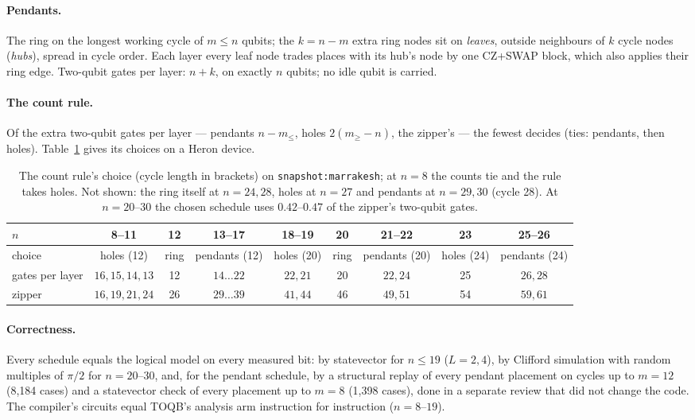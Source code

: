 \documentclass[11pt]{article}
\begin{document}
\paragraph{Pendants.} The ring on the longest working cycle of $m \le n$ qubits; the $k = n-m$ extra ring nodes sit on
\emph{leaves}, outside neighbours of $k$ cycle nodes (\emph{hubs}), spread in cycle order. Each layer every leaf node
trades places with its hub's node by one CZ+SWAP block, which also applies their ring edge. Two-qubit gates per layer:
$n + k$, on exactly $n$ qubits; no idle qubit is carried.

\paragraph{The count rule.} Of the extra two-qubit gates per layer --- pendants $n - m_{\le}$, holes $2(m_{\ge}-n)$, the
zipper's --- the fewest decides (ties: pendants, then holes). Table~\ref{tab:rule} gives its choices on a Heron device.

\begin{table}[h]
\centering
\footnotesize
\begin{tabular}{@{}lcccccccc@{}}
\toprule
$n$ & 8--11 & 12 & 13--17 & 18--19 & 20 & 21--22 & 23 & 25--26 \\
\midrule
choice & holes (12) & ring & pendants (12) & holes (20) & ring & pendants (20) & holes (24) & pendants (24) \\
gates per layer & $16, 15, 14, 13$ & 12 & $14 \dots 22$ & $22, 21$ & 20 & $22, 24$ & 25 & $26, 28$ \\
zipper & $16, 19, 21, 24$ & 26 & $29 \dots 39$ & $41, 44$ & 46 & $49, 51$ & 54 & $59, 61$ \\
\bottomrule
\end{tabular}
\caption{The count rule's choice (cycle length in brackets) on \texttt{snapshot:marrakesh}; at $n=8$ the counts tie
and the rule takes holes. Not shown: the ring itself at $n = 24, 28$, holes at $n = 27$ and pendants at $n = 29, 30$
(cycle 28). At $n = 20$--$30$ the chosen schedule uses $0.42$--$0.47$ of the zipper's two-qubit gates.}
\label{tab:rule}
\end{table}

\paragraph{Correctness.} Every schedule equals the logical model on every measured bit: by statevector for $n \le 19$
($L = 2, 4$), by Clifford simulation with random multiples of $\pi/2$ for $n = 20$--$30$, and, for the pendant
schedule, by a structural replay of every pendant placement on cycles up to $m = 12$ (8,184 cases) and a statevector
check of every placement up to $m = 8$ (1,398 cases), done in a separate review that did not change the code. The compiler's
circuits equal TOQB's analysis arm instruction for instruction ($n = 8$--$19$).
\end{document}
